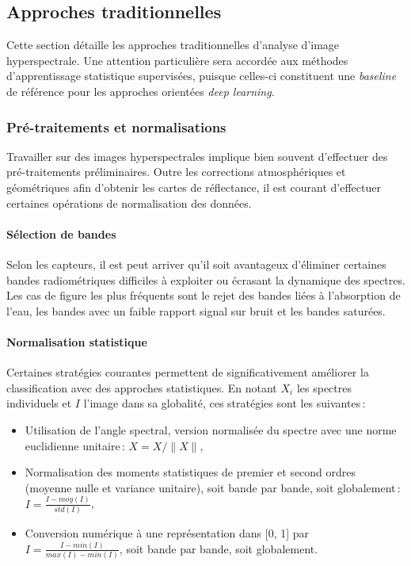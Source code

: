 \subsection{Approches traditionnelles}

Cette section détaille les approches traditionnelles d'analyse d'image hyperspectrale. Une attention particulière sera accordée aux méthodes d'apprentissage statistique supervisées, puisque celles-ci constituent une \textit{baseline} de référence pour les approches orientées \textit{deep learning}.

\subsubsection{Pré-traitements et normalisations}
Travailler sur des images hyperspectrales implique bien souvent d'effectuer des pré-traitements préliminaires. Outre les corrections atmosphériques et géométriques afin d'obtenir les cartes de réflectance, il est courant d'effectuer certaines opérations de normalisation des données.

\paragraph{Sélection de bandes} Selon les capteurs, il est peut arriver qu'il soit avantageux d'éliminer certaines bandes radiométriques difficiles à exploiter ou écrasant la dynamique des spectres. Les cas de figure les plus fréquents sont le rejet des bandes liées à l'absorption de l'eau, les bandes avec un faible rapport signal sur bruit et les bandes saturées.

\paragraph{Normalisation statistique}
Certaines stratégies courantes permettent de significativement améliorer la classification avec des approches statistiques. En notant $X_i$ les spectres individuels et $I$ l'image dans sa globalité, ces stratégies sont les suivantes\,:
\begin{itemize}
\item Utilisation de l'angle spectral, version normalisée du spectre avec une norme euclidienne unitaire\,:
$X = X / \| X \|$,
\item Normalisation des moments statistiques de premier et second ordres (moyenne nulle et variance unitaire), soit bande par bande, soit globalement\,:
$I = \frac{I - moy(I)}{std(I)}$,
\item Conversion numérique à une représentation dans [0, 1] par $I = \frac{I - min(I)}{max(I) - min(I)}$, soit bande par bande, soit globalement.
\end{itemize}

